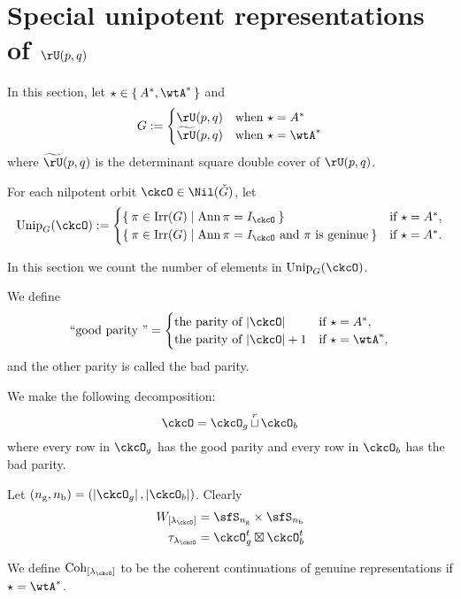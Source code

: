 \documentclass[counting_main.tex]{subfiles}
\begin{document}
\section{Special unipotent representations of $\rU(p,q)$}

In this section, let $\star \in \set{A^{*}, \wtA^{*}}$ and
\[
  G :=
  \begin{cases}
    \rU(p,q)  & \text{when }\star = A^{*}\\
    \tU(p,q)  & \text{when }\star = \wtA^{*}
\end{cases}
\]
where $\tU(p,q)$ is the determinant square double cover of $\rU(p,q)$.

For each nilpotent orbit $\ckcO\in \Nil(\ckG)$, let
\[
  \Unip_{G}(\ckcO) :=
  \begin{cases}
   \Set{\pi\in \Irr(G)| \Ann\pi = I_{\ckcO}} & \text{if $\star = A^{*}$}, \\
   \Set{\pi\in \Irr(G)| \Ann\pi = I_{\ckcO} \text{ and $\pi$ is
       geninue}} & \text{if $\star = A^{*}$}. \\
  \end{cases}
\]

In this section we count the number of elements in $\Unip_{G}(\ckcO)$.

We define
\[
  \text{``good parity ''} = \begin{cases}
    \text{the parity of $\abs{\ckcO}$} &  \text{if $\star = A^{*}$}, \\
    \text{the parity of $\abs{\ckcO}+1$} &  \text{if $\star = \wtA^{*}$}, \\
  \end{cases}
\]
and the other parity is called the bad parity.

We make the following decomposition:
\[
\ckcO = \ckcO_{g}\cuprow \ckcO_{b}
\]
where every row in $\ckcO_{g}$ has the good parity
and every row in $\ckcO_{b}$ has the bad parity.

Let $(\ngg,\nbb) = (\abs{\ckcO_g},\abs{\ckcO_b})$.
Clearly
\[
  \begin{split}
    \WLamck &= \sfS_{\ngg}\times \sfS_{\nbb}\\
    \tau_{\lamck}  & = \ckcO_{g}^{t}\boxtimes \ckcO_{b}^{t}\\
  \end{split}
\]

We define $\Coh_{\Lamck}$ to be the coherent continuations of genuine
representations if $\star = \wtA^{*}$.
\end{document}
